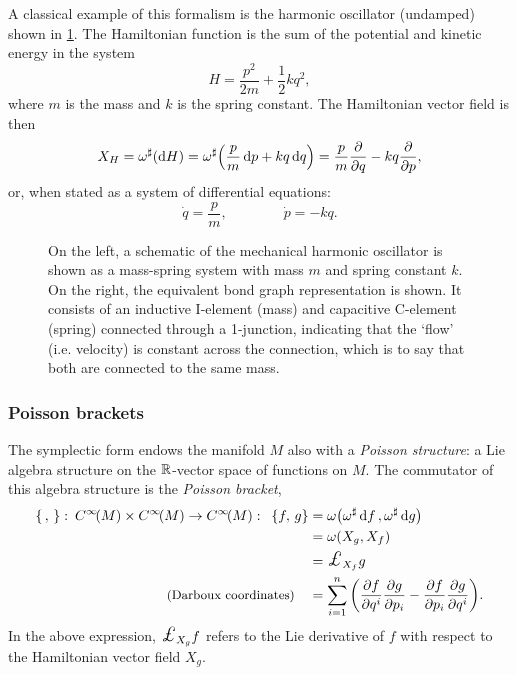 A classical example of this formalism is the harmonic oscillator (undamped) shown in \cref{fig:ho}. The Hamiltonian function is the sum of the potential and kinetic energy in the system
\begin{equation}
     H = \frac{p^2}{2m} + \frac{1}{2}kq^2,
\end{equation}
where \(m\) is the mass and \(k\) is the spring constant. The Hamiltonian vector field is then 
\begin{equation}
     X_H = \omega^\sharp\qty(\dd{H}) = \omega^\sharp\qty(\frac{p}{m}\dd{p} + kq\dd{q}) = \frac{p}{m}\pdv{}{q} - kq \pdv{}{p},
\end{equation}
or, when stated as a system of differential equations:
\begin{equation}
     \dot{q} = \frac{p}{m}, \qquad \qquad \dot{p} = -kq.
\end{equation}
\begin{figure}[ht]
    \centering
    
    \caption{On the left, a schematic of the mechanical harmonic oscillator is shown as a mass-spring system with mass \(m\) and spring constant \(k\). On the right, the equivalent bond graph representation is shown. It consists of an inductive I-element (mass) and capacitive C-element (spring) connected through a 1-junction, indicating that the `flow' (i.e. velocity) is constant across the connection, which is to say that both are connected to the same mass.}
    \label{fig:ho}
\end{figure}

\subsubsection{Poisson brackets}
The symplectic form endows the manifold \(M\) also with a \emph{Poisson structure}: a Lie algebra structure on the $\mathbb{R}$-vector space of functions on \(M\). The commutator of this algebra structure is the \emph{Poisson bracket},
\begin{equation}
    \begin{split}
        \poisson{\,}{}:\:\functions{M} \times \functions{M} \to \functions{M}: \:\;  
        \poisson{f}{g} &= \omega\qty(\fromDual{\omega}\dd{f}, \fromDual{\omega}\dd{g})  \\
                       &= \omega\qty(X_g, X_f) \\
                       &= \lied{X_f}{g} \\
        \text{\small (Darboux coordinates)} \quad &= \sum_{i = 1}^n \qty(\pdv{f}{q^i}\pdv{g}{p_i} - \pdv{f}{p_i}\pdv{g}{q^i}).
    \end{split}
\end{equation}
In the above expression, $\lied{X_g}{f}$ refers to the Lie derivative of $f$ with respect to the Hamiltonian vector field $X_g$. 

